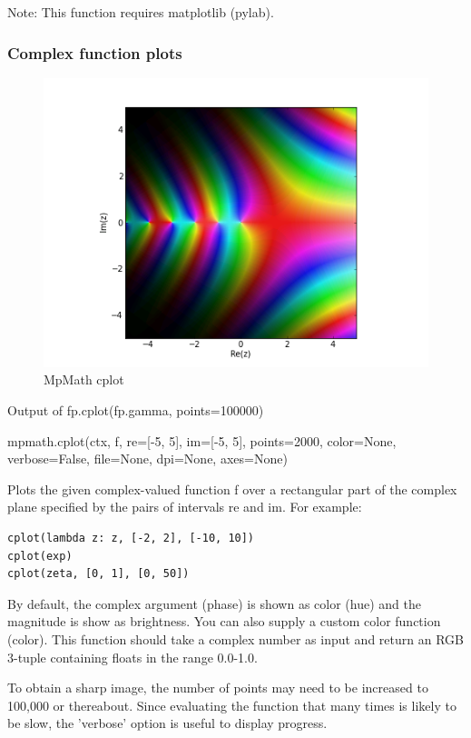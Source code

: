 Note: This function requires matplotlib (pylab).

\newpage
\subsubsection{Complex function plots}

\begin{figure}[ht]
	\centering
	\includegraphics[scale=1.0]{Charts/png/MpMathCplot.png}
	\caption{MpMath cplot}
	\label{Fig MpMath cplot}
\end{figure}



Output of fp.cplot(fp.gamma, points=100000)

\vpara
mpmath.cplot(ctx, f, re=[-5, 5], im=[-5, 5], points=2000, color=None, verbose=False, file=None, dpi=None, axes=None)

\vpara
Plots the given complex-valued function f over a rectangular part of the complex plane specified by the pairs of intervals re and im. For example:

\begin{lstlisting}
cplot(lambda z: z, [-2, 2], [-10, 10])
cplot(exp)
cplot(zeta, [0, 1], [0, 50])
\end{lstlisting}


By default, the complex argument (phase) is shown as color (hue) and the magnitude is show as brightness. You can also supply a custom color function (color). This function should take a complex number as input and return an RGB 3-tuple containing floats in the range 0.0-1.0.

\vpara
To obtain a sharp image, the number of points may need to be increased to 100,000 or thereabout. Since evaluating the function that many times is likely to be slow, the 'verbose' option is useful to display progress.

